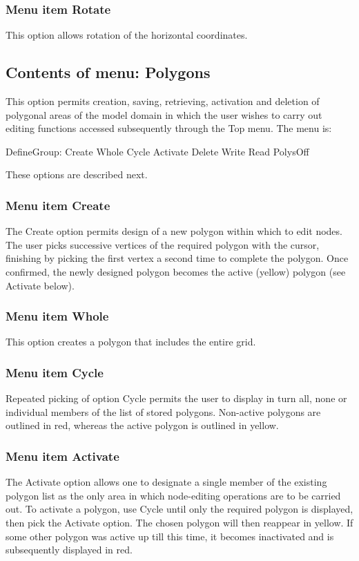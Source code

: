 \documentclass{article}
\begin{document}
\subsubsection[Menu item Rotate]{Menu item Rotate}
This option allows rotation of the horizontal coordinates.

\subsection{Contents of menu: Polygons}
This option permits creation, saving, retrieving, activation and deletion of polygonal areas of the model domain in which the user wishes to carry out editing functions accessed subsequently through the Top menu. The menu is:

DefineGroup: Create Whole Cycle Activate Delete Write Read PolysOff

These options are described next.

\subsubsection[Menu item Create]{Menu item Create}
The Create option permits design of a new polygon within which to edit nodes. The user picks successive vertices of the required polygon with the cursor, finishing by picking the first vertex a second time to complete the polygon. Once confirmed, the newly designed polygon becomes the active (yellow) polygon (see Activate below).

\subsubsection[Menu item Whole]{Menu item Whole}
This option creates a polygon that includes the entire grid.

\subsubsection[Menu item Cycle]{Menu item Cycle}
Repeated picking of option Cycle permits the user to display in turn all, none or individual members of the list of stored polygons. Non-active polygons are outlined in red, whereas the active polygon is outlined in yellow.

\subsubsection[Menu item Activate]{Menu item Activate}
The Activate option allows one to designate a single member of the existing polygon list as the only area in which node-editing operations are to be carried out. To activate a polygon, use Cycle until only the required polygon is displayed, then pick the Activate option. The chosen polygon will then reappear in yellow. If some other polygon was active up till this time, it becomes inactivated and is subsequently displayed in red.
\end{document}
